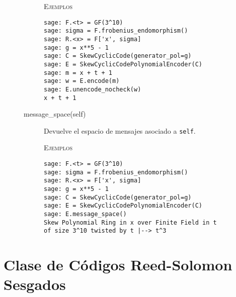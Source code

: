 \begin{description}
\begin{description}
        \textsc{Ejemplos}
        \begin{lstlisting}
sage: F.<t> = GF(3^10)
sage: sigma = F.frobenius_endomorphism()
sage: R.<x> = F['x', sigma]
sage: g = x**5 - 1
sage: C = SkewCyclicCode(generator_pol=g)
sage: E = SkewCyclicCodePolynomialEncoder(C)
sage: m = x + t + 1
sage: w = E.encode(m)
sage: E.unencode_nocheck(w)
x + t + 1
        \end{lstlisting}

        \item[message\_space(self)]
        Devuelve el espacio de mensajes asociado a \texttt{self}.

        \textsc{Ejemplos}
        \begin{lstlisting}
sage: F.<t> = GF(3^10)
sage: sigma = F.frobenius_endomorphism()
sage: R.<x> = F['x', sigma]
sage: g = x**5 - 1
sage: C = SkewCyclicCode(generator_pol=g)
sage: E = SkewCyclicCodePolynomialEncoder(C)
sage: E.message_space()
Skew Polynomial Ring in x over Finite Field in t
of size 3^10 twisted by t |--> t^3
        \end{lstlisting}
    \end{description}

\end{description}

\section{Clase de Códigos Reed-Solomon Sesgados}

